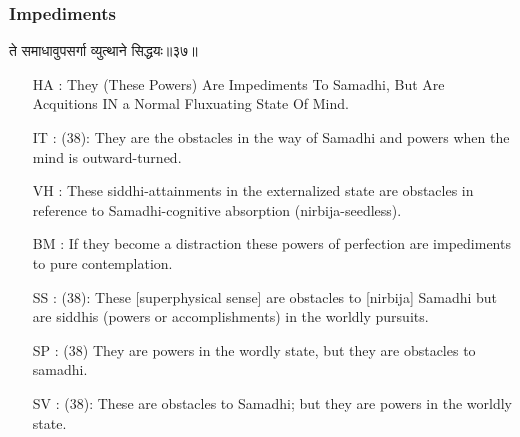 \begin{frame}[fragile]\frametitle{Impediments}
\begin{sanskrit}
ते समाधावुपसर्गा व्युत्थाने सिद्धयः॥३७॥
\end{sanskrit}
	\begin{itemize}
	\item [HA]: They (These Powers) Are Impediments To Samadhi, But Are Acquitions IN a Normal Fluxuating State Of Mind.
	\item [IT]: (38): They are the obstacles in the way of Samadhi and powers when the mind is outward-turned.
	\item [VH]: These siddhi-attainments in the externalized state are obstacles in reference to Samadhi-cognitive absorption (nirbija-seedless).
	\item [BM]: If they become a distraction these powers of perfection are impediments to pure contemplation.
	\item [SS]: (38): These [superphysical sense] are obstacles to [nirbija] Samadhi but are siddhis (powers or accomplishments) in the worldly pursuits.
	\item [SP]: (38) They are powers in the wordly state, but they are obstacles to samadhi.
	\item [SV]: (38): These are obstacles to Samadhi; but they are powers in the worldly state. 
	\end{itemize}
\end{frame}


